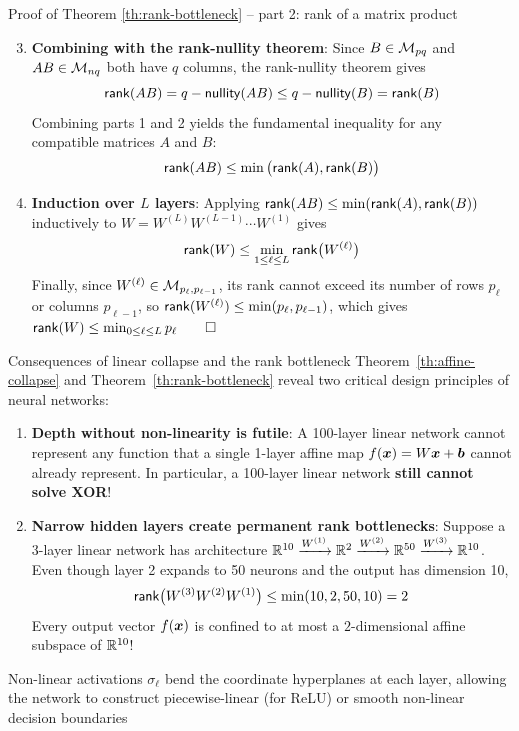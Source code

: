 \documentclass[aspectratio=169]{beamer}\usepackage[]{graphicx}\usepackage[]{xcolor}
\begin{document}
\begin{frame}[red]{Proof of Theorem \ref{th:rank-bottleneck} -- part 2: rank of a matrix product}
\begin{enumerate}
\setcounter{enumi}{2}
\item \textbf{Combining with the rank-nullity theorem}:
Since $B \in \mathcal{M}_{pq}$ and $AB \in \mathcal{M}_{nq}$ both have $q$ columns, the rank-nullity theorem gives
\[
\mathsf{rank}(AB) = q - \mathsf{nullity}(AB) \le q - \mathsf{nullity}(B) = \mathsf{rank}(B)
\]
Combining parts 1 and 2 yields the fundamental inequality for any compatible matrices $A$ and $B$:
\[
\mathsf{rank}(AB) \le \min\big(\mathsf{rank}(A), \mathsf{rank}(B)\big)
\]
\vfill
\item \textbf{Induction over $L$ layers}:
Applying $\mathsf{rank}(AB) \le \min(\mathsf{rank}(A), \mathsf{rank}(B))$ inductively to $W = W^{(L)} W^{(L-1)} \cdots W^{(1)}$ gives
\[
\mathsf{rank}(W) \le \min_{1 \le \ell \le L} \mathsf{rank}\big(W^{(\ell)}\big)
\]
Finally, since $W^{(\ell)} \in \mathcal{M}_{p_\ell, p_{\ell-1}}$, its rank cannot exceed its number of rows $p_\ell$ or columns $p_{\ell-1}$, so $\mathsf{rank}(W^{(\ell)}) \le \min(p_\ell, p_{\ell-1})$, which gives $\mathsf{rank}(W) \le \min_{0 \le \ell \le L} p_\ell \qed$
\end{enumerate}
\end{frame}


\begin{frame}{Consequences of linear collapse and the rank bottleneck}
Theorem~\ref{th:affine-collapse} and Theorem~\ref{th:rank-bottleneck} reveal two critical design principles of neural networks:
\vfill
\begin{enumerate}
\item \textbf{Depth without non-linearity is futile}:
A 100-layer linear network cannot represent any function that a single 1-layer affine map $f(\bm{x}) = W\bm{x} + \bm{b}$ cannot already represent. In particular, a 100-layer linear network \textbf{still cannot solve XOR}!
\vfill
\item \textbf{Narrow hidden layers create permanent rank bottlenecks}:
Suppose a 3-layer linear network has architecture $\mathbb{R}^{10} \xrightarrow{W^{(1)}} \mathbb{R}^2 \xrightarrow{W^{(2)}} \mathbb{R}^{50} \xrightarrow{W^{(3)}} \mathbb{R}^{10}$. Even though layer 2 expands to 50 neurons and the output has dimension 10,
\[
\mathsf{rank}\big(W^{(3)} W^{(2)} W^{(1)}\big) \le \min(10, 2, 50, 10) = 2
\]
Every output vector $f(\bm{x})$ is confined to at most a $2$-dimensional affine subspace of $\mathbb{R}^{10}$!
\end{enumerate}
\vfill
Non-linear activations $\sigma_\ell$ bend the coordinate hyperplanes at each layer, allowing the network to construct piecewise-linear (for ReLU) or smooth non-linear decision boundaries
\end{frame}
\end{document}
